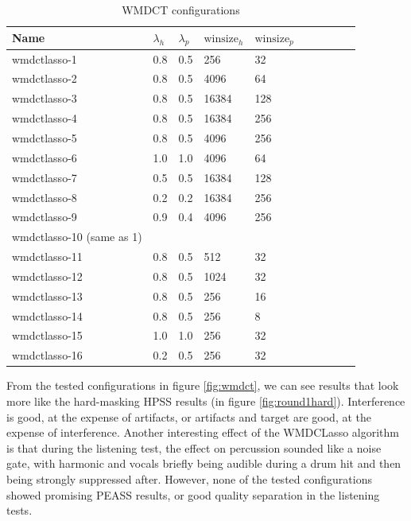 \documentclass[letter,12pt]{article}
\begin{document}
\begin{table}[ht]
	\centering
\begin{tabular}{ |l|l|l|l|l|c|c|c|c|c| }
	 \hline
	  Name & $\lambda_{h}$ & $\lambda_{p}$ & $\text{winsize}_{h}$ & $\text{winsize}_{p}$ \\
	 \hline
	 \hline
	 wmdctlasso-1 & 0.8 & 0.5 & 256 & 32 \\
	 \hline
	 wmdctlasso-2 & 0.8 & 0.5 & 4096 & 64 \\
	 \hline
	 wmdctlasso-3 & 0.8 & 0.5 & 16384 & 128 \\
	 \hline
	 wmdctlasso-4 & 0.8 & 0.5 & 16384 & 256 \\
	 \hline
	 wmdctlasso-5 & 0.8 & 0.5 & 4096 & 256 \\
	 \hline
	 wmdctlasso-6 & 1.0 & 1.0 & 4096 & 64 \\
	 \hline
	 wmdctlasso-7 & 0.5 & 0.5 & 16384 & 128 \\
	 \hline
	 wmdctlasso-8 & 0.2 & 0.2 & 16384 & 256 \\
	 \hline
	 wmdctlasso-9 & 0.9 & 0.4 & 4096 & 256 \\
	 \hline
	 wmdctlasso-10 (same as 1) & & & & \\
	 \hline
	 wmdctlasso-11 & 0.8 & 0.5 & 512 & 32 \\
	 \hline
	 wmdctlasso-12 & 0.8 & 0.5 & 1024 & 32 \\
	 \hline
	 wmdctlasso-13 & 0.8 & 0.5 & 256 & 16 \\
	 \hline
	 wmdctlasso-14 & 0.8 & 0.5 & 256 & 8 \\
	 \hline
	 wmdctlasso-15 & 1.0 & 1.0 & 256 & 32 \\
	 \hline
	 wmdctlasso-16 & 0.2 & 0.5 & 256 & 32 \\
	 \hline
\end{tabular}
	\caption{WMDCT configurations}
	\label{table:round2wmdct}
\end{table}

From the tested configurations in figure \ref{fig:wmdct}, we can see results that look more like the hard-masking HPSS results (in figure \ref{fig:round1hard}). Interference is good, at the expense of artifacts, or artifacts and target are good, at the expense of interference. Another interesting effect of the WMDCLasso algorithm is that during the listening test, the effect on percussion sounded like a noise gate, with harmonic and vocals briefly being audible during a drum hit and then being strongly suppressed after. However, none of the tested configurations showed promising PEASS results, or good quality separation in the listening tests.
\end{document}
